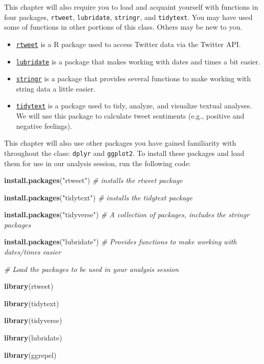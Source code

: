 \documentclass[
]{book}
\newenvironment{Shaded}{\begin{snugshade}}{\end{snugshade}}
\newcommand{\CommentTok}[1]{\textcolor[rgb]{0.56,0.35,0.01}{\textit{#1}}}
\newcommand{\KeywordTok}[1]{\textcolor[rgb]{0.13,0.29,0.53}{\textbf{#1}}}
\newcommand{\NormalTok}[1]{#1}
\newcommand{\StringTok}[1]{\textcolor[rgb]{0.31,0.60,0.02}{#1}}
\begin{document}
This chapter will also require you to load and acquaint yourself with functions in four packages, \texttt{rtweet}, \texttt{lubridate}, \texttt{stringr}, and \texttt{tidytext}. You may have used some of functions in other portions of this class. Others may be new to you.

\begin{itemize}
\item
  \href{https://rtweet.info/index.html}{\texttt{rtweet}} is a R package used to access Twitter data via the Twitter API.
\item
  \href{https://lubridate.tidyverse.org/}{\texttt{lubridate}} is a package that makes working with dates and times a bit easier.
\item
  \href{https://stringr.tidyverse.org/}{\texttt{stringr}} is a package that provides several functions to make working with string data a little easier.
\item
  \href{https://juliasilge.github.io/tidytext/}{\texttt{tidytext}} is a package used to tidy, analyze, and visualize textual analyses. We will use this package to calculate tweet sentiments (e.g., positive and negative feelings).
\end{itemize}

This chapter will also use other packages you have gained familiarity with throughout the class: \texttt{dplyr} and \texttt{ggplot2}. To install these packages and load them for use in our analysis session, run the following code:

\begin{Shaded}
\begin{Highlighting}[]
\KeywordTok{install.packages}\NormalTok{(}\StringTok{"rtweet"}\NormalTok{) }\CommentTok{# installs the rtweet package}

\KeywordTok{install.packages}\NormalTok{(}\StringTok{"tidytext"}\NormalTok{) }\CommentTok{# installs the tidytext package}

\KeywordTok{install.packages}\NormalTok{(}\StringTok{"tidyverse"}\NormalTok{) }\CommentTok{# A collection of packages, includes the stringr packages}

\KeywordTok{install.packages}\NormalTok{(}\StringTok{"lubridate"}\NormalTok{) }\CommentTok{# Provides functions to make working with dates/times easier}
\end{Highlighting}
\end{Shaded}

\begin{Shaded}
\begin{Highlighting}[]
\CommentTok{# Load the packages to be used in your analysis session}

\KeywordTok{library}\NormalTok{(rtweet)}

\KeywordTok{library}\NormalTok{(tidytext)}

\KeywordTok{library}\NormalTok{(tidyverse)}

\KeywordTok{library}\NormalTok{(lubridate)}

\KeywordTok{library}\NormalTok{(ggrepel)}
\end{Highlighting}
\end{Shaded}
\end{document}
